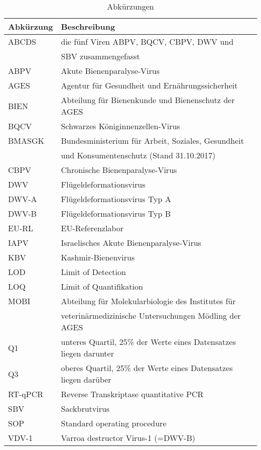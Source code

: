 \begin{table}[h!]
    \centering
    \caption{Abkürzungen}
    \label{tab:g:abkürzungen}
    \begin{tabular}{l|l}
        \toprule
        Abkürzung   &   Beschreibung\\
        \midrule
        ABCDS       & die fünf Viren   ABPV, BQCV, CBPV, DWV und \\
                    & SBV zusammengefasst\\
        ABPV        & Akute Bienenparalyse-Virus\\
        AGES        & Agentur für Gesundheit und Ernährungssicherheit\\
        BIEN        & Abteilung für Bienenkunde und Bienenschutz der AGES\\
        BQCV        & Schwarzes Königinnenzellen-Virus\\
        BMASGK      & Bundesministerium für Arbeit, Soziales, Gesundheit\\
                    & und Konsumentenschutz (Stand 31.10.2017)\\
        CBPV        & Chronische Bienenparalyse-Virus\\
        DWV         & Flügeldeformationsvirus\\
        DWV-A       & Flügeldeformationsvirus Typ A\\
        DWV-B       & Flügeldeformationsvirus Typ B\\
        EU-RL       & EU-Referenzlabor\\
        IAPV        & Israelisches Akute Bienenparalyse-Virus\\
        KBV         & Kashmir-Bienenvirus\\
        LOD         & Limit of Detection\\
        LOQ         & Limit of Quantifikation\\
        MOBI        & Abteilung für Molekularbiologie des Institutes für\\
                    & veterinärmedizinische Untersuchungen Mödling der AGES\\
        Q1          & unteres Quartil, 25\% der Werte eines Datensatzes liegen darunter\\
        Q3          & oberes Quartil, 25\% der Werte eines Datensatzes liegen darüber\\
        RT-qPCR     & Reverse Transkriptase quantitative PCR\\
        SBV         & Sackbrutvirus\\
        SOP         & Standard operating procedure\\
        VDV-1       & Varroa destructor Virus-1 (=DWV-B)\\
    \end{tabular}
\end{table}